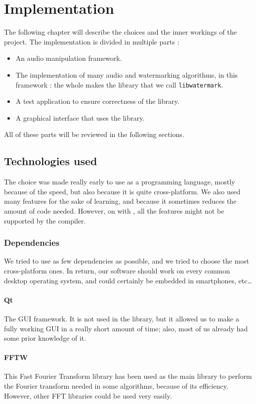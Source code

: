 \chapter{Implementation}
The following chapter will describe the choices and the inner workings of the project.
The implementation is divided in multiple parts : 

\begin{itemize}
\item An audio manipulation framework.
\item The implementation of many audio and watermarking algorithms, in this framework : the whole makes the library that we call \texttt{libwatermark}.
\item A test application to ensure correctness of the library.
\item A graphical interface that uses the library.
\end{itemize}

All of these parts will be reviewed in the following sections.

\section{Technologies used}
The choice was made really early to use  as a programming language, mostly because of the speed, but also because it is quite cross-platform. We also used many  features for the sake of learning, and because it sometimes reduces the amount of code needed. However, on  with , all the features might not be supported by the compiler.

\subsection{Dependencies}
We tried to use as few dependencies as possible, and we tried to choose the most cross-platform ones. In return, our software should work on every common desktop operating system, and could certainly be embedded in smartphones, etc\dots
\subsubsection{Qt}
The GUI framework. It is not used in the library, but it allowed us to make a fully working GUI in a really short amount of time; also, most of us already had some prior knowledge of it.
\subsubsection{FFTW}
This Fast Fourier Transform library has been used as the main library to perform the Fourier transform needed in some algorithms, because of its efficiency. However, other FFT libraries could be used very easily.
